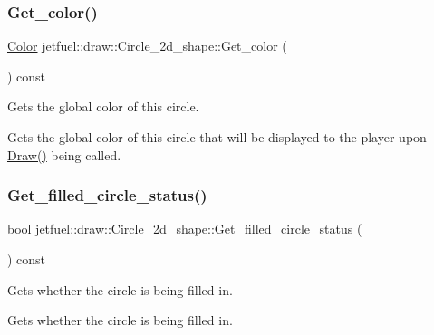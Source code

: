 \subsubsection{\texorpdfstring{Get\+\_\+color()}{Get\_color()}}
{\footnotesize\ttfamily \hyperlink{classjetfuel_1_1draw_1_1Color}{Color} jetfuel\+::draw\+::\+Circle\+\_\+2d\+\_\+shape\+::\+Get\+\_\+color (\begin{DoxyParamCaption}{ }\end{DoxyParamCaption}) const\hspace{0.3cm}{\ttfamily [inline]}}



Gets the global color of this circle. 

Gets the global color of this circle that will be displayed to the player upon \hyperlink{classjetfuel_1_1draw_1_1Circle__2d__shape_a8be660f3cd624dc077d9003ee3b37212}{Draw()} being called. \mbox{\label{classjetfuel_1_1draw_1_1Circle__2d__shape_af742bd69519677da00692b9c8b7b0d74}} 
\subsubsection{\texorpdfstring{Get\+\_\+filled\+\_\+circle\+\_\+status()}{Get\_filled\_circle\_status()}}
{\footnotesize\ttfamily bool jetfuel\+::draw\+::\+Circle\+\_\+2d\+\_\+shape\+::\+Get\+\_\+filled\+\_\+circle\+\_\+status (\begin{DoxyParamCaption}{ }\end{DoxyParamCaption}) const\hspace{0.3cm}{\ttfamily [inline]}}



Gets whether the circle is being filled in. 

Gets whether the circle is being filled in. \mbox{\label{classjetfuel_1_1draw_1_1Circle__2d__shape_a99b93544660c7f5b11cf8f0169e8fec1}} 

